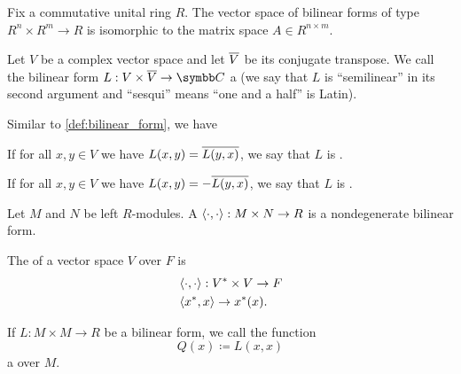 \begin{corollary}\label{thm:bilinear_forms_isomorphic_to_matrices}
  Fix a commutative unital ring \( R \). The vector space of bilinear forms of type \( R^n \times R^m \to R \) is isomorphic to the matrix space \( A \in R^{n \times m} \).
\end{corollary}

\begin{definition}\label{def:sesquilinear_form}\cite[258]{Knapp2016BAlg}
  Let \( V \) be a complex vector space and let \( \overline{V} \) be its conjugate transpose. We call the bilinear form \( L: V \times \Ol V \to \C \) a  (we say that \( L \) is \enquote{semilinear} in its second argument and \enquote{sesqui} means \enquote{one and a half} is Latin).

  Similar to \cref{def:bilinear_form}, we have
  \begin{defenum}
     If for all \( x, y \in V \) we have \( L(x, y) = \overline{L(y, x)} \), we say that \( L \) is .

     If for all \( x, y \in V \) we have \( L(x, y) = -\overline{L(y, x)} \), we say that \( L \) is .
  \end{defenum}
\end{definition}

\begin{definition}\label{def:duality_pairing}
  Let \( M \) and \( N \) be left \( R \)-modules. A  \( \left\langle \cdot, \cdot \right\rangle: M \times N \to R \) is a nondegenerate bilinear form.

  The  of a vector space \( V \) over \( F \) is
  \begin{align*}
    &\left\langle \cdot, \cdot \right\rangle: V^* \times V \to F \\
    &\left\langle x^*, x \right\rangle \to x^*(x).
  \end{align*}
\end{definition}

\begin{definition}\label{def:quadratic_form}
  If \( L: M \times M \to R \) be a bilinear form, we call the function
  \begin{equation*}
    Q(x) \coloneqq L(x, x)
  \end{equation*}
  a  over \( M \).
\end{definition}

